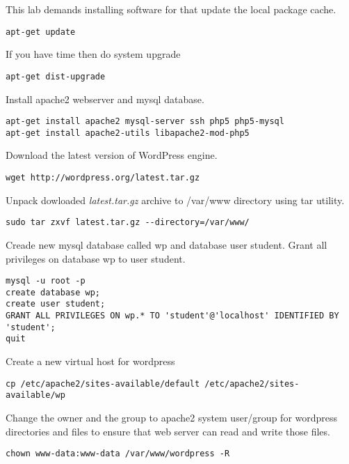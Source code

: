 This lab demands installing software for that update the local package cache.


\begin{verbatim}
apt-get update
\end{verbatim}

If you have time then do system upgrade
\begin{verbatim}
apt-get dist-upgrade
\end{verbatim}

Install apache2 webserver and mysql database.
\begin{verbatim}
apt-get install apache2 mysql-server ssh php5 php5-mysql 
apt-get install apache2-utils libapache2-mod-php5
\end{verbatim}

Download the latest version of WordPress engine.
\begin{verbatim}
wget http://wordpress.org/latest.tar.gz
\end{verbatim}

Unpack dowloaded \emph{latest.tar.gz} archive to  /var/www directory using tar utility.

\begin{verbatim}
sudo tar zxvf latest.tar.gz --directory=/var/www/
\end{verbatim}

Creade new mysql database called wp and database user student. Grant all privileges on database wp to user student.

\begin{verbatim}
mysql -u root -p
create database wp;
create user student;
GRANT ALL PRIVILEGES ON wp.* TO 'student'@'localhost' IDENTIFIED BY 'student';
quit
\end{verbatim}

Create a new virtual host for wordpress 
\begin{verbatim}
cp /etc/apache2/sites-available/default /etc/apache2/sites-available/wp
\end{verbatim}

Change the owner and the group to apache2 system user/group for wordpress directories and files to ensure that web server can read and write those files.
\begin{verbatim}
chown www-data:www-data /var/www/wordpress -R
\end{verbatim}

